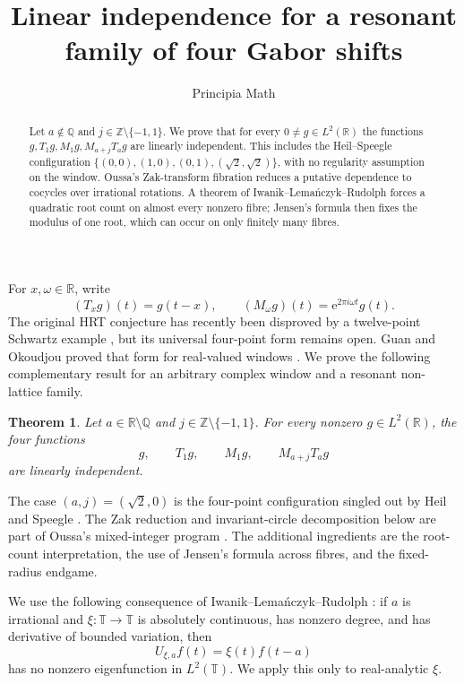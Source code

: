 \documentclass[10pt]{amsart}
\title{Linear independence for a resonant family of four Gabor shifts}
\author{Principia Math}
\date{}
\newtheorem{theorem}{Theorem}
\newcommand{\R}{\mathbb R}
\newcommand{\Z}{\mathbb Z}
\newcommand{\T}{\mathbb T}
\newcommand{\e}{\mathrm e}
\begin{document}
\begin{abstract}
Let $a\notin\mathbb Q$ and $j\in\mathbb Z\setminus\{-1,1\}$. We prove that for every
$0\neq g\in L^2(\mathbb R)$ the functions $g,T_1g,M_1g,M_{a+j}T_ag$ are linearly independent.
This includes the Heil--Speegle configuration
$\{(0,0),(1,0),(0,1),(\sqrt2,\sqrt2)\}$, with no regularity assumption on the window.
Oussa's Zak-transform fibration reduces a putative dependence to cocycles over irrational
rotations. A theorem of Iwanik--Lema\'nczyk--Rudolph forces a quadratic root count on almost
every nonzero fibre; Jensen's formula then fixes the modulus of one root, which can occur on
only finitely many fibres.
\end{abstract}

\maketitle

For $x,\omega\in\R$, write
\[
(T_xg)(t)=g(t-x),\qquad (M_\omega g)(t)=\e^{2\pi i\omega t}g(t).
\]
The original HRT conjecture has recently been disproved by a twelve-point Schwartz example
\cite{FPVV}, but its universal four-point form remains open. Guan and Okoudjou proved that
form for real-valued windows \cite{GO}. We prove the following complementary result for an
arbitrary complex window and a resonant non-lattice family.

\begin{theorem}\label{thm:main}
Let $a\in\R\setminus\mathbb Q$ and $j\in\Z\setminus\{-1,1\}$. For every nonzero
$g\in L^2(\R)$, the four functions
\[
g,\qquad T_1g,\qquad M_1g,\qquad M_{a+j}T_ag
\]
are linearly independent.
\end{theorem}

The case $(a,j)=(\sqrt2,0)$ is the four-point configuration singled out by Heil and Speegle
\cite{HS}. The Zak reduction and invariant-circle decomposition below are part of Oussa's
mixed-integer program \cite{Oussa}. The additional ingredients are the root-count
interpretation, the use of Jensen's formula across fibres, and the fixed-radius endgame.

We use the following consequence of Iwanik--Lema\'nczyk--Rudolph \cite{ILR}: if $a$ is
irrational and $\xi:\T\to\T$ is absolutely continuous, has nonzero degree, and has derivative
of bounded variation, then
\[
U_{\xi,a}f(t)=\xi(t)f(t-a)
\]
has no nonzero eigenfunction in $L^2(\T)$. We apply this only to real-analytic $\xi$.
\end{document}
